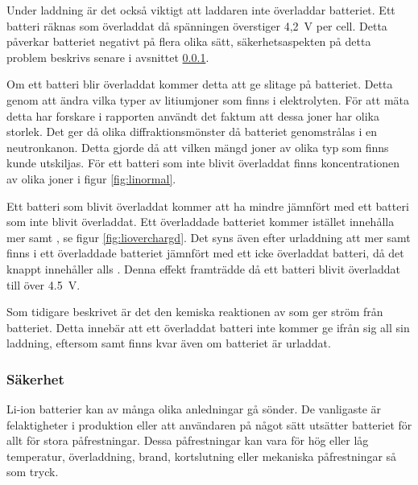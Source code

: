 \documentclass[a4paper,12pt]{article}
\begin{document}
Under laddning är det också viktigt att laddaren inte överladdar batteriet. Ett batteri räknas som överladdat då spänningen överstiger 4,2~V per cell. Detta påverkar batteriet negativt på flera olika sätt, säkerhetsaspekten på detta problem beskrivs senare i avsnittet \ref{säkerhet}.

Om ett batteri blir överladdat kommer detta att ge slitage på batteriet. Detta genom att ändra vilka typer av litiumjoner som finns i elektrolyten. För att mäta detta har forskare i rapporten \cite{overcharging-type} användt det faktum att dessa joner har olika storlek. Det ger då olika diffraktionsmönster då batteriet genomstrålas i en neutronkanon. Detta gjorde då att vilken mängd joner av olika typ som finns kunde utskiljas. För ett batteri som inte blivit överladdat finns koncentrationen av olika joner i figur \ref{fig:linormal}.


Ett batteri som blivit överladdat kommer att ha mindre  jämnfört med ett batteri som inte blivit överladdat. Ett överladdade batteriet kommer istället innehålla mer  samt  \cite{overcharging-type}, se figur \ref{fig:lioverchargd}. Det syns även efter urladdning att mer  samt  finns i ett överladdade batteriet jämnfört med ett icke överladdat batteri, då det knappt innehåller  alls \cite{overcharging-type}. Denna effekt framträdde då ett batteri blivit överladdat till över 4.5~V.


Som tidigare beskrivet är det den kemiska reaktionen av  som ger ström från batteriet. Detta innebär att ett överladdat batteri inte kommer ge ifrån sig all sin laddning, eftersom  samt  finns kvar även om batteriet är urladdat.

\subsubsection{Säkerhet}
\label{säkerhet}
Li-ion batterier kan av många olika anledningar gå sönder. De vanligaste är felaktigheter i produktion eller att användaren på något sätt utsätter batteriet för allt för stora påfrestningar. Dessa påfrestningar kan vara för hög eller låg temperatur, överladdning, brand, kortslutning eller mekaniska påfrestningar så som tryck. \cite{lihazard}
\end{document}
